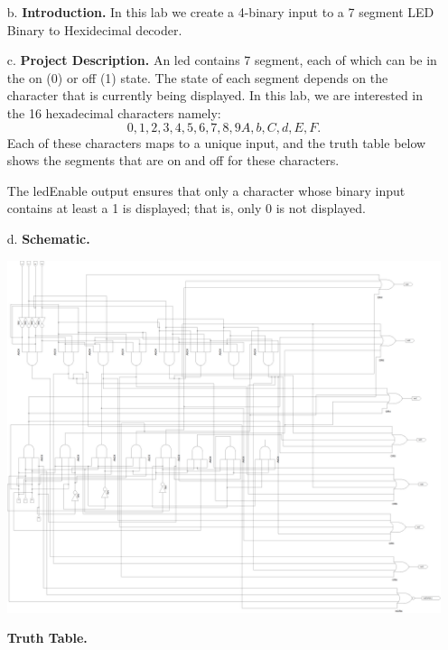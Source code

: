 \documentclass[9pt]{article}
\begin{document}
\begin{enumerate}
   \item[b.] \textbf{Introduction.} In this lab we create a 4-binary input to a
              7 segment LED Binary to Hexidecimal decoder.
   \item[c.] \textbf{Project Description.} An led contains 7 segment, each of
             which can be in the on (0) or off (1) state. The state of each 
             segment depends on the character that is currently being displayed. 
             In this lab, we are interested in the 16 hexadecimal characters 
             namely:
             $$0, 1, 2, 3, 4, 5, 6, 7, 8, 9 A, b, C, d, E, F.$$
             Each of these characters maps to a unique input, and the truth 
             table below shows the segments that are on and off for these 
             characters.

             The ledEnable output ensures that only a character whose binary 
             input contains at least a 1 is displayed; that is, only 0 is not
             displayed.

  	\item[d.] \textbf{Schematic.}
             \begin{center}
                \includegraphics[width=\textwidth]{schematic.png}
             \end{center}
             
             \textbf{Truth Table.}   
   

\end{enumerate}
\end{document}
